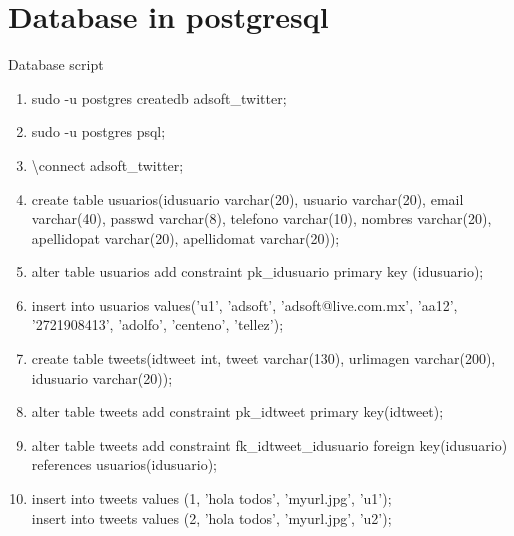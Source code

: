 \documentclass[10pt]{article}         %
\begin{document}
\section{Database in postgresql}
Database script

\begin{enumerate}

\item
	sudo -u postgres createdb adsoft\_twitter;
\item
	sudo -u postgres psql;
\item
	\textbackslash connect adsoft\_twitter;
\item
	create table usuarios(idusuario varchar(20), usuario varchar(20), email varchar(40), passwd varchar(8), telefono varchar(10), nombres varchar(20), apellidopat varchar(20), apellidomat varchar(20));
\item
	alter table usuarios add constraint pk\_idusuario primary key (idusuario);
\item
	insert into usuarios values('u1', 'adsoft', 'adsoft@live.com.mx', 'aa12', '2721908413', 'adolfo', 'centeno', 'tellez');
\item
	create table tweets(idtweet int, tweet varchar(130), urlimagen varchar(200), idusuario varchar(20));	
\item
	alter table tweets add constraint pk\_idtweet primary key(idtweet);
\item
	alter table tweets add constraint fk\_idtweet\_idusuario foreign key(idusuario) references usuarios(idusuario);
\item
	insert into tweets values (1, 'hola todos', 'myurl.jpg', 'u1'); \\
	insert into tweets values (2, 'hola todos', 'myurl.jpg', 'u2'); \\

\end{enumerate}
\end{document}
